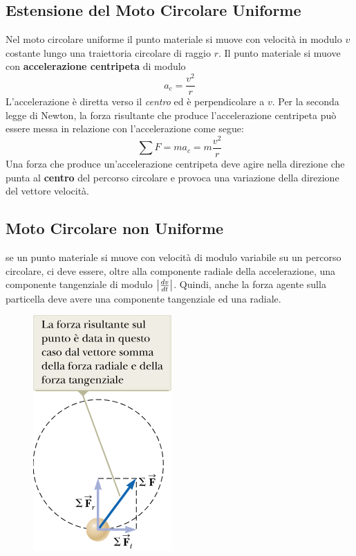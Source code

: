 \documentclass[a4paper,11pt,oneside]{book}
\begin{document}
\subsection{Estensione del Moto Circolare Uniforme}
Nel moto circolare uniforme il punto materiale si muove con velocità in modulo $v$ costante lungo una traiettoria circolare di raggio $r$.
Il punto materiale si muove con \textbf{accelerazione centripeta} di modulo
\begin{equation*}
    a_c = \frac{v^2}{r}
\end{equation*}
L'accelerazione è diretta verso il \emph{centro} ed è perpendicolare a $v$. Per la seconda legge di Newton, la forza risultante che produce l'accelerazione centripeta
può essere messa in relazione con l'accelerazione come segue:
\begin{equation*}
    \sum F = ma_c = m \frac{v^2}{r}
\end{equation*}
Una forza che produce un’accelerazione centripeta deve agire nella direzione che punta al \textbf{centro} del percorso circolare e provoca una variazione della direzione del vettore velocità.

\subsection{Moto Circolare non Uniforme}
se un punto materiale si muove con velocità di modulo variabile su un percorso circolare, ci deve essere, oltre alla componente radiale della accelerazione, una componente tangenziale di modulo $\abs{\tfrac{dv}{dt}}$. Quindi, anche la forza agente sulla particella deve avere una componente tangenziale ed una radiale.
\begin{figure}[h]
    \centering
    \includegraphics[scale=0.4]{newton_moto_circolare_non_uniforme.png}
\end{figure}
\end{document}
